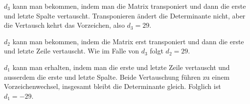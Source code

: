 \begin{loesung}
\begin{teilaufgaben}
$d_3$ kann man bekommen, indem man die Matrix transponiert und
dann die erste und letzte Spalte vertauscht. 
Transponieren ändert die Determinante nicht, aber die Vertausch
kehrt das Vorzeichen, also $d_3=29$.

$d_2$ kann man bekommen, indem die Matrix erst transponiert und dann
die erste und letzte Zeile vertauscht.
Wie im Falle von $d_3$ folgt $d_2=29$.

$d_1$ kann man erhalten, indem man die erste und letzte Zeile vertauscht
und ausserdem die erste und letzte Spalte.
Beide Vertauschung führen zu einem Vorzeichenwechsel, insgesamt bleibt
die Determinante gleich. 
Folglich ist $d_1=-29$.
\qedhere
\end{teilaufgaben}
\end{loesung}

